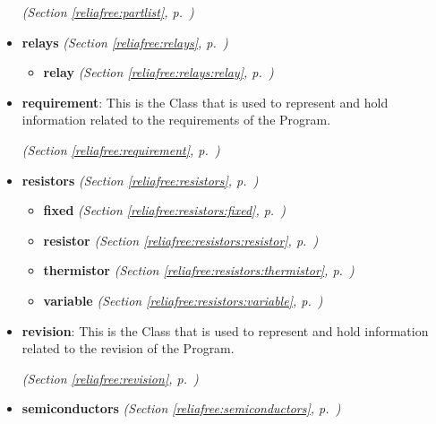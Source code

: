 \begin{itemize}
  \textit{(Section \ref{reliafree:partlist}, p.~\pageref{reliafree:partlist})}

\item \textbf{relays}
  \textit{(Section \ref{reliafree:relays}, p.~\pageref{reliafree:relays})}

  \begin{itemize}
\setlength{\parskip}{0ex}
    \item \textbf{relay}
  \textit{(Section \ref{reliafree:relays:relay}, p.~\pageref{reliafree:relays:relay})}

  \end{itemize}
\item \textbf{requirement}: This is the Class that is used to represent and hold information related to
the requirements of the Program.



  \textit{(Section \ref{reliafree:requirement}, p.~\pageref{reliafree:requirement})}

\item \textbf{resistors}
  \textit{(Section \ref{reliafree:resistors}, p.~\pageref{reliafree:resistors})}

  \begin{itemize}
\setlength{\parskip}{0ex}
    \item \textbf{fixed}
  \textit{(Section \ref{reliafree:resistors:fixed}, p.~\pageref{reliafree:resistors:fixed})}

    \item \textbf{resistor}
  \textit{(Section \ref{reliafree:resistors:resistor}, p.~\pageref{reliafree:resistors:resistor})}

    \item \textbf{thermistor}
  \textit{(Section \ref{reliafree:resistors:thermistor}, p.~\pageref{reliafree:resistors:thermistor})}

    \item \textbf{variable}
  \textit{(Section \ref{reliafree:resistors:variable}, p.~\pageref{reliafree:resistors:variable})}

  \end{itemize}
\item \textbf{revision}: This is the Class that is used to represent and hold information related to
the revision of the Program.



  \textit{(Section \ref{reliafree:revision}, p.~\pageref{reliafree:revision})}

\item \textbf{semiconductors}
  \textit{(Section \ref{reliafree:semiconductors}, p.~\pageref{reliafree:semiconductors})}


\end{itemize}
